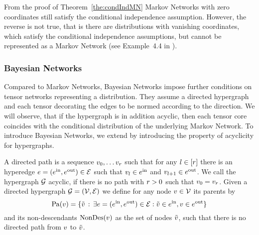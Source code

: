From the proof of Theorem~\ref{the:condIndMN} Markov Networks with zero coordinates still satisfy the conditional independence assumption.
However, the reverse is not true, that is there are distributions with vanishing coordinates, which satisfy the conditional independence assumptions, but cannot be represented as a Markov Network (see Example~4.4 in \cite{koller_probabilistic_2009}).




\subsubsection{Bayesian Networks}

Compared to Markov Networks, Bayesian Networks impose further conditions on tensor networks representing a distribution.
They assume a directed hypergraph and each tensor decorating the edges to be normed according to the direction.
We will observe, that if the hypergraph is in addition acyclic, then each tensor core coincides with the conditional distribution of the underlying Markov Network.
To introduce Bayesian Networks, we extend  by introducing the property of acyclicity for hypergraphs.


\begin{definition}
	A directed path is a sequence $v_{0},\ldots v_{r}$ such that for any $l\in[r]$ there is an hyperedge $e=(e^{\mathrm{in}},e^{\mathrm{out}})\in\mathcal{E}$ such that $v_{l}\in e^{\mathrm{in}}$ and $v_{l+1}\in e^{\mathrm{out}}$.
	We call the hypergraph $\mathcal{G}$ acyclic, if there is no path with $r>0$ such that $v_{0}=v_{r}$.
	Given a directed hypergraph $\mathcal{G}=(\mathcal{V},\mathcal{E})$ we define for any node $v\in\mathcal{V}$ its parents by
		\[ \mathrm{Pa}(v) = \{\tilde{v} \, : \, \exists e=(e^{\mathrm{in}},e^{\mathrm{out}})\in\mathcal{E}: \tilde{v}\in e^{\mathrm{in}},v\in e^{\mathrm{out}} \} \]
	and its non-descendants $\mathrm{NonDes}(v)$ as the set of nodes $\tilde{v}$, such that there is no directed path from $v$ to $\tilde{v}$.
\end{definition}

